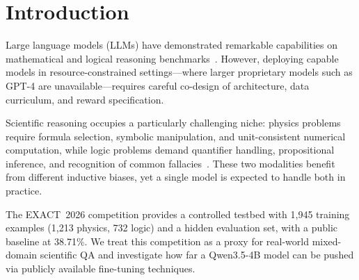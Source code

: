 \documentclass[cmc,journal,article,submit,moreauthors,pdftex]{Definitions/tsp}
\newcommand{\basemodelname}{Qwen3.5-4B}
\newcommand{\dataset}{EXACT~2026}
\begin{document}
\section{Introduction}\label{sec:intro}

Large language models (LLMs) have demonstrated remarkable capabilities
on mathematical and logical reasoning benchmarks~\cite{Wei2022,Wang2023sc,Kojima2022}.
However, deploying capable models in resource-constrained settings---where
larger proprietary models such as GPT-4 are unavailable---requires careful
co-design of architecture, data curriculum, and reward specification.

Scientific reasoning occupies a particularly challenging niche:
physics problems require formula selection, symbolic manipulation, and
unit-consistent numerical computation, while logic problems demand
quantifier handling, propositional inference, and recognition of common
fallacies~\cite{Wang2024scibench,Rein2023}.
These two modalities benefit from different inductive biases, yet a
single model is expected to handle both in practice.

The \dataset{} competition provides a controlled testbed with 1,945
training examples (1,213 physics, 732 logic) and a hidden evaluation
set, with a public baseline at 38.71\%.
We treat this competition as a proxy for real-world mixed-domain
scientific QA and investigate how far a \basemodelname{} model can be
pushed via publicly available fine-tuning techniques.
\end{document}
